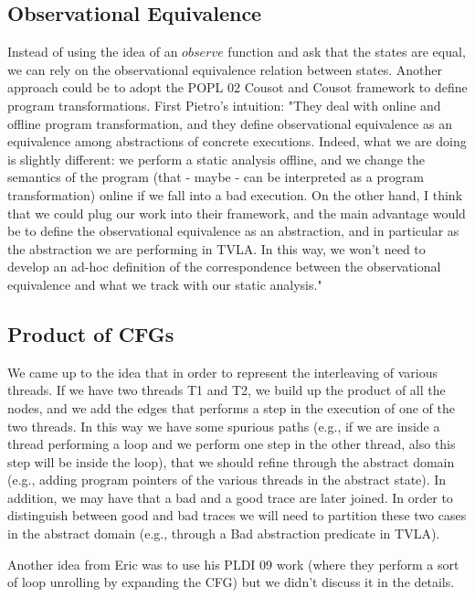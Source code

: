 \subsection{Observational Equivalence}
Instead of using the idea of an $\mathit{observe}$ function and ask that the states are equal, we can rely on the observational equivalence relation between states. Another approach could be to adopt the POPL 02 Cousot and Cousot framework to define program transformations. First Pietro's intuition: "They deal with online and offline program transformation, and they define observational equivalence as an equivalence among abstractions of concrete executions. Indeed, what we are doing is slightly different: we perform a static analysis offline, and we change the semantics of the program (that - maybe - can be interpreted as a program transformation) online if we fall into a bad execution. On the other hand, I think that we could plug our work into their framework, and the main advantage would be to define the observational equivalence as an abstraction, and in particular as the abstraction we are performing in TVLA. In this way, we won't need to develop an ad-hoc definition of the correspondence between the observational equivalence and what we track with our static analysis."

\subsection{Product of CFGs}
We came up to the idea that in order to represent the interleaving of various threads. If we have two threads T1 and T2, we build up the product of all the nodes, and we add the edges that performs a step in the execution of one of the two threads. In this way we have some spurious paths (e.g., if we are inside a thread performing a loop and we perform one step in the other thread, also this step will be inside the loop), that we should refine through the abstract domain (e.g., adding program pointers of the various threads in the abstract state). In addition, we may have that a bad and a good trace are later joined. In order to distinguish between good and bad traces we will need to partition these two cases in the abstract domain (e.g., through a Bad abstraction predicate in TVLA).

Another idea from Eric was to use his PLDI 09 work (where they perform a sort of loop unrolling by expanding the CFG) but we didn't discuss it in the details.

